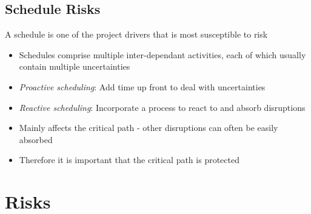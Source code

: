 \documentclass{article}[18pt]
\begin{document}
\subsection{Schedule Risks}
A schedule is one of the project drivers that is most susceptible to risk
\begin{itemize}
	\item Schedules comprise multiple inter-dependant activities, each of which usually contain multiple uncertainties
	\item \textit{Proactive scheduling}: Add time up front to deal with uncertainties
	\item \textit{Reactive scheduling}: Incorporate a process to react to and absorb disruptions
	\item Mainly affects the critical path - other disruptions can often be easily absorbed
	\item Therefore it is important that the critical path is protected
\end{itemize} 
\section{Risks}
\end{document}

